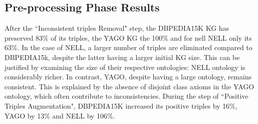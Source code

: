 \documentclass[sigconf]{acmart}
\begin{document}

\subsection{Pre-processing Phase Results}

After the ``Inconsistent triples Removal" step, the DBPEDIA15K KG has preserved 83\% of its triples, the YAGO KG the 100\% and for nell NELL only its 63\%. In the case of NELL, a larger number of triples are eliminated compared to DBPEDIA15k, despite the latter having a larger initial KG size.  This can be justified by examining the size of their respective ontologies: NELL ontology is considerably richer. In contrast, YAGO, despite having a large ontology, remains consistent. This is explained by the absence of disjoint class axioms in the YAGO ontology, which often contribute to inconsistencies.
 During the step of ``Positive Triples Augmentation", DBPEDIA15K increased its positive triples by 16\%, YAGO by 13\% and NELL by 106\%. 
\end{document}
